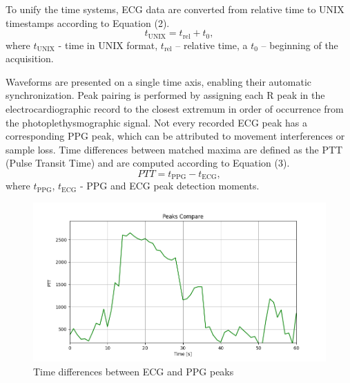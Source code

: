 \documentclass{citask}
\begin{document}
To unify the time systems, ECG data are converted from relative time to UNIX timestamps according to Equation (2).
\begin{equation}
t_{\mathrm{UNIX}} = t_{\mathrm{rel}} + t_{0},
\end{equation}
where $t_{\mathrm{UNIX}}$ - time in UNIX format, $t_{\mathrm{rel}}$ – relative time, a $t_{0}$ – beginning of the acquisition.

Waveforms are presented on a single time axis, enabling their automatic synchronization. Peak pairing is performed by assigning each R peak in the electrocardiographic record to the closest extremum in order of occurrence from the photoplethysmographic signal. Not every recorded ECG peak has a corresponding PPG peak, which can be attributed to movement interferences or sample loss. Time differences between matched maxima are defined as the PTT (Pulse Transit Time) and are computed according to Equation (3).
\begin{equation}
PTT = t_{\mathrm{PPG}} - t_{\mathrm{ECG}},
\end{equation}
where $t_{\mathrm{PPG}}$, $t_{\mathrm{ECG}}$ - PPG and ECG peak detection moments. 

\begin{figure}[htbp]
    \centering
    \includegraphics[width=1.0\linewidth]{images/Peaks_compare.png}
   \caption{Time differences between ECG and PPG peaks}%
    \label{fig:PTT}
\end{figure}
\end{document}
